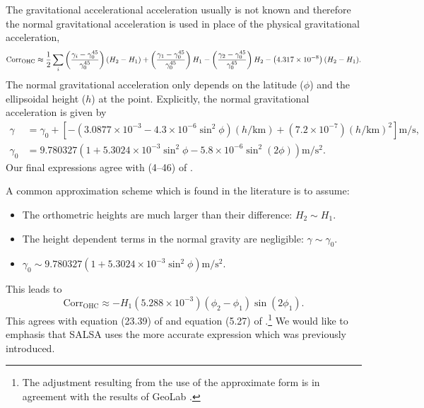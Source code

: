 The gravitational accelerational acceleration usually is not known and therefore the normal gravitational acceleration is used in place of the physical gravitational acceleration,
\begin{equation}
\text{Corr}_{\text{OHC}}\approx\frac{1}{2}\sum_i\left(\frac{\gamma_i-\gamma_0^{45}}{\gamma_0^{45}}\right)\left(H_2-H_1\right)+\left(\frac{\gamma_1-\gamma_0^{45}}{\gamma_0^{45}}\right)H_1-\left(\frac{\gamma_2-\gamma_0^{45}}{\gamma_0^{45}}\right)H_2-\left(4.317\times10^{-8}\right)(H_2-H_1).
\end{equation}
The normal gravitational acceleration only depends on the latitude ($\phi$) and the ellipsoidal height ($h$) at the point.  Explicitly, the normal gravitational acceleration is given by
\begin{equation}
\begin{split}
\gamma &= \gamma_0 +\left[-\left(3.0877\times10^{-3}-4.3\times10^{-6}\sin^2\phi\right)(h/\text{km})+\left(7.2\times10^{-7}\right)(h/\text{km})^2\right]\text{m}/\text{s},\\
\gamma_0&=9.780327\left(1+5.3024\times10^{-3}\sin^2\phi-5.8\times10^{-6}\sin^2(2\phi)\right)\text{m}/\text{s}^2.
\end{split}
\end{equation}
Our final expressions agree with (4--46) of \cite{wellenhof}.

A common approximation scheme which is found in the literature is to assume:
\begin{itemize}
\item The orthometric heights are much larger than their difference: $H_2\sim H_1$.
\item The height dependent terms in the normal gravity are negligible: $\gamma\sim\gamma_0$.
\item $\gamma_0\sim9.780327\left(1+5.3024\times10^{-3}\sin^2\phi\right)\text{m}/\text{s}^2.$
\end{itemize}
This leads to
\begin{equation}\label{eq:OHCapprox}
\text{Corr}_{\text{OHC}}\approx-H_1\left(5.288\times10^{-3}\right)\left(\phi_2-\phi_1\right)\sin\left(2\phi_1\right).
\end{equation}
This agrees with equation (23.39) of \cite{ghilani} and equation (5.27) of \cite{anderson}.\footnote{The adjustment resulting from the use of the approximate form is in agreement with the results of GeoLab \cite{geolab}.}  We would like to emphasis that SALSA uses the more accurate expression which was previously introduced.
